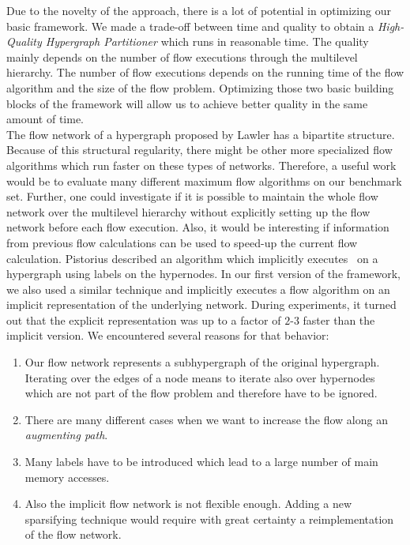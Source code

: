 Due to the novelty of the approach, there is a lot of potential in optimizing our basic 
framework. We made a trade-off between time and quality to obtain a \emph{High-Quality 
Hypergraph Partitioner} which runs in reasonable time. The quality mainly depends
on the number of flow executions through the multilevel hierarchy. The number of flow
executions depends on the running time of the flow algorithm and the size of the flow
problem. Optimizing those two basic building blocks of the framework will allow us to
achieve better quality in the same amount of time.\\
The flow network of a hypergraph proposed by Lawler \cite{lawler1973} has a bipartite 
structure. Because of this structural regularity, there might be other more specialized
flow algorithms which run faster on these types of networks. Therefore, a useful work 
would be to evaluate many different maximum flow algorithms on our benchmark set. Further,
one could investigate if it is possible to maintain the whole flow network over the
multilevel hierarchy without explicitly setting up the flow network before each flow
execution. Also, it would be interesting if information from previous flow calculations can 
be used to speed-up the current flow calculation. Pistorius \cite{pistorius2003} described
an algorithm which implicitly executes \EdmondKarp~on a hypergraph using
labels on the hypernodes. In our first version of the framework, we also used a similar 
technique and implicitly executes a flow algorithm on an implicit representation of 
the underlying network. During experiments, it turned out that the explicit representation
was up to a factor of $2$-$3$ faster than the implicit version. We encountered several reasons
for that behavior: 
\begin{enumerate}
\item Our flow network represents a subhypergraph of the original hypergraph. Iterating 
      over the edges of a node means to iterate also over hypernodes which are not part of 
      the flow problem and therefore have to be ignored.
\item There are many different cases when we want to increase the flow along an 
      \emph{augmenting path}.
\item Many labels have to be introduced which lead to a large number of 
      main memory accesses.
\item Also the implicit flow network is not flexible enough. Adding a new sparsifying
      technique would require with great certainty a reimplementation of the flow network.
\end{enumerate}
